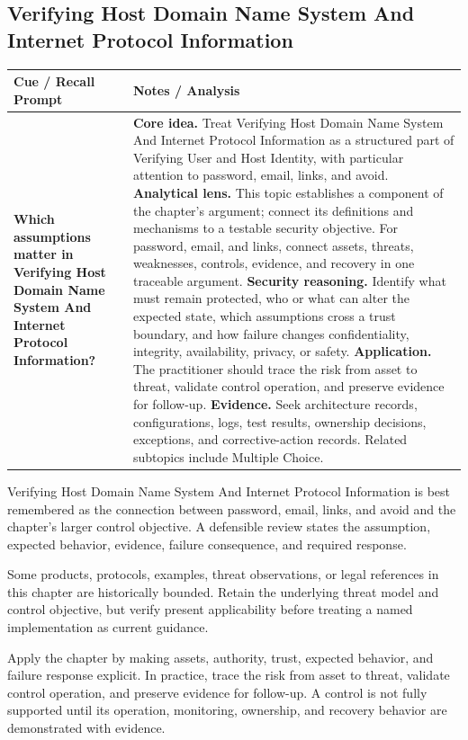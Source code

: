 \documentclass[11pt]{article}
\newcommand{\CornellHeader}{%
\rowcolor{Navy}\color{white}\bfseries Cue / Recall Prompt & \color{white}\bfseries Notes / Analysis\\\hline}
\newcommand{\CornellRow}[2]{%
\cellcolor{CueGray}\RaggedRight\textbf{#1} & \RaggedRight #2\\\hline}
\begin{document}
\subsection*{Verifying Host Domain Name System And Internet Protocol Information}
\begin{longtable}{>{\RaggedRight\arraybackslash}p{}|>{\RaggedRight\arraybackslash}p{}}
\CornellHeader
\CornellRow{Which assumptions matter in Verifying Host Domain Name System And Internet Protocol Information?}{\textbf{Core idea.} Treat Verifying Host Domain Name System And Internet Protocol Information as a structured part of Verifying User and Host Identity, with particular attention to password, email, links, and avoid. \textbf{Analytical lens.} This topic establishes a component of the chapter's argument; connect its definitions and mechanisms to a testable security objective. For password, email, and links, connect assets, threats, weaknesses, controls, evidence, and recovery in one traceable argument. \textbf{Security reasoning.} Identify what must remain protected, who or what can alter the expected state, which assumptions cross a trust boundary, and how failure changes confidentiality, integrity, availability, privacy, or safety. \textbf{Application.} The practitioner should trace the risk from asset to threat, validate control operation, and preserve evidence for follow-up. \textbf{Evidence.} Seek architecture records, configurations, logs, test results, ownership decisions, exceptions, and corrective-action records. Related subtopics include Multiple Choice.}
\end{longtable}
\begin{topicsummary}
Verifying Host Domain Name System And Internet Protocol Information is best remembered as the connection between password, email, links, and avoid and the chapter's larger control objective. A defensible review states the assumption, expected behavior, evidence, failure consequence, and required response.
\end{topicsummary}
\begin{historybox}
Some products, protocols, examples, threat observations, or legal references in this chapter are historically bounded. Retain the underlying threat model and control objective, but verify present applicability before treating a named implementation as current guidance.
\end{historybox}
\begin{defensebox}
Apply the chapter by making assets, authority, trust, expected behavior, and failure response explicit. In practice, trace the risk from asset to threat, validate control operation, and preserve evidence for follow-up. A control is not fully supported until its operation, monitoring, ownership, and recovery behavior are demonstrated with evidence.
\end{defensebox}
\end{document}
